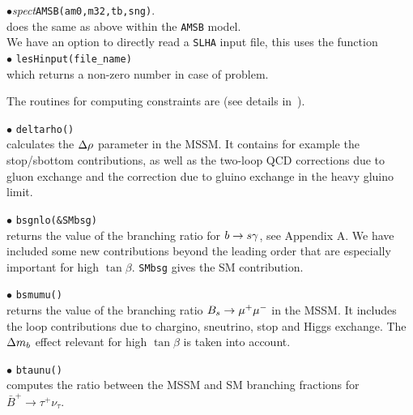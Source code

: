 \documentclass[12pt,a4paper]{article}
\begin{document}
\noindent
$\bullet${\it spect}\verb|AMSB(am0,m32,tb,sng)|.\\
does  the same as above within the {\tt AMSB} model.\\



We  have an option to directly read a {\tt SLHA}  input file, this uses the  function \\
\noi$\bullet$ \verb|lesHinput(file_name) |\\
which returns a non-zero number in case of problem.

The routines for computing constraints are (see details
in~\cite{Belanger:2004yn}).

\noi$\bullet$ \verb|deltarho()|\\
 calculates  the $\Delta\rho$ parameter in the MSSM.  It contains for example the 
stop/sbottom contributions, as well as the two-loop QCD
corrections due to gluon exchange and the correction due to gluino
exchange in the heavy gluino limit.

\noi$\bullet$ \verb|bsgnlo(&SMbsg)|\\ returns the value of the branching ratio for  $b\rightarrow s\gamma$, see Appendix A. 
We have included some new contributions beyond the leading order that are
especially important for high $\tan\beta$. \verb|SMbsg| gives the SM contribution.

\noi$\bullet$ \verb|bsmumu()|\\ returns the value of the branching ratio $B_s\to \mu^+\mu^-$ in the
MSSM.
It includes the loop contributions
due to chargino, sneutrino, stop and Higgs exchange. The $\Delta m_b$ 
effect relevant for high $\tan \beta$ is taken into account.

\noi$\bullet$ \verb|btaunu()|\\
computes the ratio between the MSSM and SM branching fractions for $\bar{B}^+\rightarrow\tau^+\nu_\tau$. 
\end{document}
